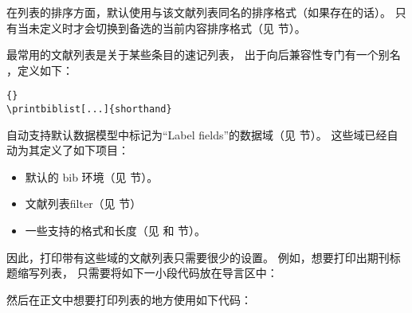 \begin{ltxsyntax}
在列表的排序方面，默认使用与该文献列表同名的排序格式（如果存在的话）。
只有当未定义时才会切换到备选的当前内容排序格式（见  节）。


最常用的文献列表是关于某些条目的速记列表，
出于向后兼容性专门有一个别名 ，定义如下：

\begin{lstlisting}[style=latex]{}
\printbiblist[...]{shorthand}
\end{lstlisting}


\biblatex 自动支持默认数据模型中标记为“Label fields”的数据域（见  节）。
这些域已经自动为其定义了如下项目：

\begin{itemize}
\item %
默认的 bib 环境（见  节）。
\item %
文献列表filter（见  节）
\item %
一些支持的格式和长度（见  和  节）。
\end{itemize}
%
因此，打印带有这些域的文献列表只需要很少的设置。
例如，想要打印出期刊标题缩写列表，
只需要将如下一小段代码放在导言区中：

\begin{ltxexample}
\end{ltxexample}
%
然后在正文中想要打印列表的地方使用如下代码：


\end{ltxsyntax}
